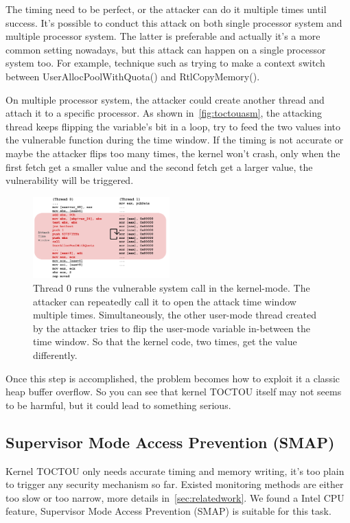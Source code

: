 The timing need to be perfect, or the attacker can do it multiple times until success. It's possible to conduct this attack on both single processor system and multiple processor system. The latter is preferable and actually it's a more common setting nowadays, but this attack can happen on a single processor system too. For example, technique such as trying to make a context switch between UserAllocPoolWithQuota() and RtlCopyMemory().

On multiple processor system, the attacker could create another thread and attach it to a specific processor. As shown in~\autoref{fig:toctouasm}, the attacking thread keeps flipping the variable's bit in a loop, try to feed the two values into the vulnerable function during the time window.
If the timing is not accurate or maybe the attacker flips too many times, the kernel won't crash, only when the first fetch get a smaller value and the second fetch get a larger value, the vulnerability will be triggered.

\begin{figure}[ht]
  \includegraphics[width=0.47\textwidth]{figures/toctouasm3}
  \centering
  \caption{Thread 0 runs the vulnerable system call in the kernel-mode. The attacker can repeatedly call it to open the attack time window multiple times. Simultaneously, the other user-mode thread created by the attacker tries to flip the user-mode variable in-between the time window. So that the kernel code, two times, get the value differently.}
  \label{fig:toctouasm}
\end{figure}


Once this step is accomplished, the problem becomes how to exploit it a classic heap buffer overflow. So you can see that kernel TOCTOU itself may not seems to be harmful, but it could lead to something serious. 

\subsection{Supervisor Mode Access Prevention (SMAP)}
Kernel TOCTOU only needs accurate timing and memory writing, it's too plain to trigger any security mechanism so far. Existed monitoring methods are either too slow or too narrow, more details in~\autoref{sec:relatedwork}. We found a Intel CPU feature, Supervisor Mode Access Prevention (SMAP) is suitable for this task. 

